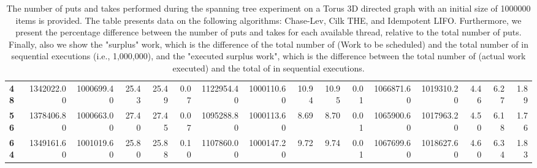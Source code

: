 \begin{table}[!ht]
{\begin{tabular}{lrrrrrrrrrrrrrrr}
\textbf{48} & 1342022.00 & 1000699.40 &          25.43 &       25.49 &                 0.07 & 1122954.40 & 1000110.60 &          10.94 &       10.95 &                 0.01 &      1066871.60 & 1019310.20 &           4.46 &        6.27 &                 1.89 \\
\textbf{56} & 1378406.80 & 1000663.00 &          27.40 &       27.45 &                 0.07 & 1095288.80 & 1000113.60 &           8.69 &        8.70 &                 0.01 &      1065900.60 & 1017963.20 &           4.50 &        6.18 &                 1.76 \\
\textbf{64} & 1349161.60 & 1001019.60 &          25.80 &       25.88 &                 0.10 & 1107860.00 & 1000147.20 &           9.72 &        9.74 &                 0.01 &      1067699.60 & 1018627.60 &           4.60 &        6.34 &                 1.83 \\
\bottomrule
\end{tabular}}
\label{difference-Torus_3D_directed-1000000-CHASELEV-CILK-IDEMPOTENT_LIFO}
\caption{The number of puts and takes performed during the
    spanning tree experiment on a Torus 3D directed graph with an initial size
    of 1000000 items is provided. The table presents data on the
    following algorithms: Chase-Lev, Cilk THE, and
    Idempotent LIFO. Furthermore, we present the percentage difference
    between the number of puts and takes for each available thread,
    relative to the total number of puts. Finally, also we show the
    "surplus" work, which is the difference of the total number of
    \Puts (Work to be scheduled) and the total number of \Puts in
    sequential executions (i.e., 1,000,000), and the "executed surplus
    work", which is the difference between the total number of \Takes
    (actual work executed) and the total of \Takes in sequential
    executions.}
\end{table}
